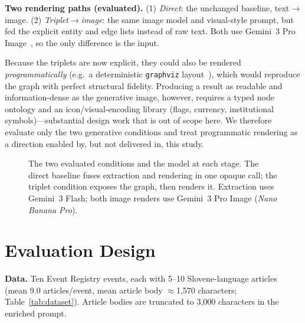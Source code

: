 \documentclass[sigconf,natbib=false, language=english]{acmart}
\begin{document}
\textbf{Two rendering paths (evaluated).} (1) \emph{Direct}: the unchanged baseline, text$\rightarrow$image. (2) \emph{Triplet$\rightarrow$image}: the same image model and visual-style prompt, but fed the explicit entity and edge lists instead of raw text. Both use Gemini~3 Pro Image~\cite{gemini}, so the only difference is the input.

Because the triplets are now explicit, they could also be rendered \emph{programmatically} (e.g.\ a deterministic \texttt{graphviz} layout~\cite{graphviz}), which would reproduce the graph with perfect structural fidelity. Producing a result as readable and information-dense as the generative image, however, requires a typed node ontology and an icon/visual-encoding library (flags, currency, institutional symbols)---substantial design work that is out of scope here. We therefore evaluate only the two generative conditions and treat programmatic rendering as a direction enabled by, but not delivered in, this study.

\begin{figure}[t]
  \centering
  \caption{The two evaluated conditions and the model at each stage. The direct baseline fuses extraction and rendering in one opaque call; the triplet condition exposes the graph, then renders it. Extraction uses Gemini~3 Flash; both image renders use Gemini~3 Pro Image (\emph{Nano Banana Pro}).}
  \label{fig:pipeline}
\end{figure}

\section{Evaluation Design}
\textbf{Data.} Ten Event Registry events, each with 5--10 Slovene-language articles (mean 9.0 articles/event, mean article body $\approx$1{,}570 characters; Table~\ref{tab:dataset}). Article bodies are truncated to 3{,}000 characters in the enriched prompt.
\end{document}
